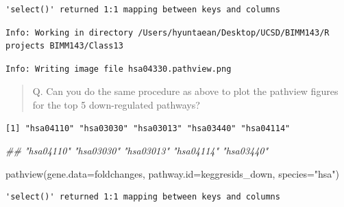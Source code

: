 \documentclass[
  letterpaper,
  DIV=11,
  numbers=noendperiod]{scrartcl}
\newenvironment{Shaded}{\begin{snugshade}}{\end{snugshade}}
\newcommand{\AttributeTok}[1]{\textcolor[rgb]{0.40,0.45,0.13}{#1}}
\newcommand{\DecValTok}[1]{\textcolor[rgb]{0.68,0.00,0.00}{#1}}
\newcommand{\DocumentationTok}[1]{\textcolor[rgb]{0.37,0.37,0.37}{\textit{#1}}}
\newcommand{\FunctionTok}[1]{\textcolor[rgb]{0.28,0.35,0.67}{#1}}
\newcommand{\NormalTok}[1]{\textcolor[rgb]{0.00,0.23,0.31}{#1}}
\newcommand{\OtherTok}[1]{\textcolor[rgb]{0.00,0.23,0.31}{#1}}
\newcommand{\SpecialCharTok}[1]{\textcolor[rgb]{0.37,0.37,0.37}{#1}}
\newcommand{\StringTok}[1]{\textcolor[rgb]{0.13,0.47,0.30}{#1}}
\begin{document}
\begin{verbatim}
'select()' returned 1:1 mapping between keys and columns
\end{verbatim}

\begin{verbatim}
Info: Working in directory /Users/hyuntaean/Desktop/UCSD/BIMM143/R projects BIMM143/Class13
\end{verbatim}

\begin{verbatim}
Info: Writing image file hsa04330.pathview.png
\end{verbatim}

\begin{quote}
Q. Can you do the same procedure as above to plot the pathview figures
for the top 5 down-regulated pathways?
\end{quote}

\begin{Shaded}
\end{Shaded}

\begin{verbatim}
[1] "hsa04110" "hsa03030" "hsa03013" "hsa03440" "hsa04114"
\end{verbatim}

\begin{Shaded}
\begin{Highlighting}[]
\DocumentationTok{\#\# "hsa04110" "hsa03030" "hsa03013" "hsa04114" "hsa03440"}

\FunctionTok{pathview}\NormalTok{(}\AttributeTok{gene.data=}\NormalTok{foldchanges, }\AttributeTok{pathway.id=}\NormalTok{keggresids\_down, }\AttributeTok{species=}\StringTok{"hsa"}\NormalTok{)}
\end{Highlighting}
\end{Shaded}

\begin{verbatim}
'select()' returned 1:1 mapping between keys and columns
\end{verbatim}
\end{document}
